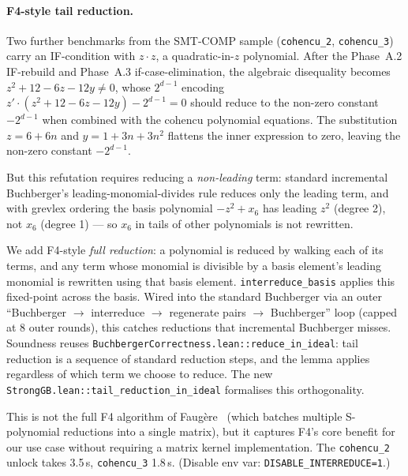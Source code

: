 \documentclass[runningheads]{llncs}
\begin{document}
\paragraph{F4-style tail reduction.}
Two further benchmarks from the SMT-COMP sample
(\texttt{cohencu\_2}, \texttt{cohencu\_3}) carry an
IF-condition with $z \cdot z$, a quadratic-in-$z$ polynomial.
After the Phase~A.2 IF-rebuild and Phase~A.3 if-case-elimination,
the algebraic disequality becomes
$z^2 + 12 - 6z - 12y \neq 0$, whose $2^{d-1}$ encoding
$z' \cdot (z^2 + 12 - 6z - 12y) - 2^{d-1} = 0$ should reduce to the
non-zero constant $-2^{d-1}$ when combined with the cohencu
polynomial equations. The
substitution $z = 6 + 6n$ and $y = 1 + 3n + 3n^2$ flattens the
inner expression to zero, leaving the non-zero constant $-2^{d-1}$.

But this refutation requires reducing a \emph{non-leading}
term: standard incremental Buchberger's leading-monomial-divides
rule reduces only the leading term, and with grevlex ordering
the basis polynomial $-z^2 + x_6$ has leading $z^2$ (degree 2),
not $x_6$ (degree 1) --- so $x_6$ in tails of other polynomials
is not rewritten.

We add F4-style \emph{full reduction}: a polynomial is reduced
by walking each of its terms, and any term whose monomial is
divisible by a basis element's leading monomial is rewritten
using that basis element. \texttt{interreduce\_basis} applies
this fixed-point across the basis. Wired into the standard
Buchberger via an outer ``Buchberger $\to$ interreduce $\to$
regenerate pairs $\to$ Buchberger'' loop (capped at 8 outer
rounds), this catches reductions that incremental Buchberger
misses. Soundness reuses
\texttt{BuchbergerCorrectness.lean::reduce\_in\_ideal}: tail
reduction is a sequence of standard reduction steps, and the
lemma applies regardless of which term we choose to reduce.
The new \texttt{StrongGB.lean::tail\_reduction\_in\_ideal}
formalises this orthogonality.

This is not the full F4 algorithm of Faug\`ere~\cite{faugere1999f4}
(which batches multiple S-polynomial reductions into a single
matrix), but it captures F4's core benefit for our use case
without requiring a matrix kernel implementation. The
\texttt{cohencu\_2} unlock takes 3.5\,s, \texttt{cohencu\_3}
1.8\,s. (Disable env var:
\texttt{DISABLE\_INTERREDUCE=1}.)
\end{document}
